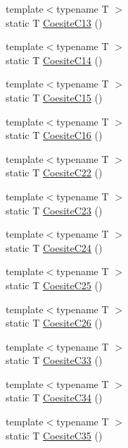 \begin{DoxyCompactItemize}
{\footnotesize template$<$typename T $>$ }\\static T \mbox{\hyperlink{namespacempc_1_1data_ad1e255951fc10a606cadd1ffcaf67b8d}{Coesite\+C13}} ()
\item 
{\footnotesize template$<$typename T $>$ }\\static T \mbox{\hyperlink{namespacempc_1_1data_a48025f0c08f0bb7de3af84fffc200397}{Coesite\+C14}} ()
\item 
{\footnotesize template$<$typename T $>$ }\\static T \mbox{\hyperlink{namespacempc_1_1data_a7654b43a0cd2f1e5e9cebc753538c9b0}{Coesite\+C15}} ()
\item 
{\footnotesize template$<$typename T $>$ }\\static T \mbox{\hyperlink{namespacempc_1_1data_aaa5dbc03d926e2983154883d2bbabdc8}{Coesite\+C16}} ()
\item 
{\footnotesize template$<$typename T $>$ }\\static T \mbox{\hyperlink{namespacempc_1_1data_a0e26b08e0f72e5e4bc3160e519051fd9}{Coesite\+C22}} ()
\item 
{\footnotesize template$<$typename T $>$ }\\static T \mbox{\hyperlink{namespacempc_1_1data_a20598cffe03dbfa42b6e4c12e9af5580}{Coesite\+C23}} ()
\item 
{\footnotesize template$<$typename T $>$ }\\static T \mbox{\hyperlink{namespacempc_1_1data_a71b85a240dac038c5c1839510b9dc8a4}{Coesite\+C24}} ()
\item 
{\footnotesize template$<$typename T $>$ }\\static T \mbox{\hyperlink{namespacempc_1_1data_ada4c784f786fd654334514c4f711f427}{Coesite\+C25}} ()
\item 
{\footnotesize template$<$typename T $>$ }\\static T \mbox{\hyperlink{namespacempc_1_1data_ac3c7a78365ce9a367d253b12e58a4b93}{Coesite\+C26}} ()
\item 
{\footnotesize template$<$typename T $>$ }\\static T \mbox{\hyperlink{namespacempc_1_1data_a869ca594d2cfed19ceaccbb21df9034b}{Coesite\+C33}} ()
\item 
{\footnotesize template$<$typename T $>$ }\\static T \mbox{\hyperlink{namespacempc_1_1data_a2c02d8a88cbab6cd64fe839d7c802ef6}{Coesite\+C34}} ()
\item 
{\footnotesize template$<$typename T $>$ }\\static T \mbox{\hyperlink{namespacempc_1_1data_aeb581837ff89f3539a4eb622b306487c}{Coesite\+C35}} ()

\end{DoxyCompactItemize}
